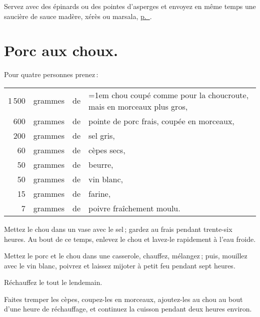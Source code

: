 Servez avec des épinards ou des pointes d'asperges et envoyez en même temps
une saucière de sauce madère, xérès ou marsala, \hyperlink{p0459}{p. \pageref{pg0459}}.

\section*{\centering Porc aux choux.}
{}

Pour quatre personnes prenez :

\medskip

\footnotesize
\begin{longtable}{rrrp{16em}}
  1 500 & grammes & de & \hangindent=1em chou coupé comme pour la choucroute, mais en morceaux plus gros, \\
    600 & grammes & de & pointe de porc frais, coupée en morceaux,                                        \\
    200 & grammes & de & sel gris,                                                                        \\
     60 & grammes & de & cèpes secs,                                                                      \\
     50 & grammes & de & beurre,                                                                          \\
     50 & grammes & de & vin blanc,                                                                       \\
     15 & grammes & de & farine,                                                                          \\
      7 & grammes & de & poivre fraîchement moulu.                                                        \\
\end{longtable}
\normalsize

Mettez le chou dans un vase avec le sel ; gardez au frais pendant trente-six
heures. Au bout de ce temps, enlevez le chou et lavez-le rapidement à l'eau
froide.

Mettez le porc et le chou dans une casserole, chauffez, mélangez ; puis,
mouillez avec le vin blanc, poivrez et laissez mijoter à petit feu pendant sept
heures.

Réchauffez le tout le lendemain.

Faites tremper les cèpes, coupez-les en morceaux, ajoutez-les au chou au bout
d'une heure de réchauffage, et continuez la cuisson pendant deux heures
environ.


